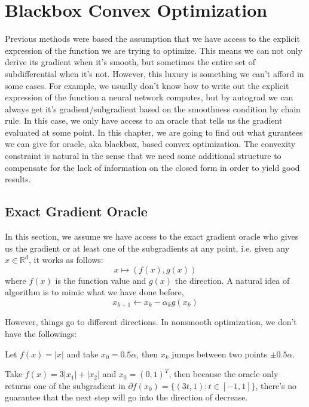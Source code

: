 \chapter{Blackbox Convex Optimization}

Previous methods were based the assumption that we have access to the explicit expression of the function we are trying to optimize. This means we can not only derive its gradient when it's smooth, but sometimes the entire set of subdifferential when it's not. However, this luxury is something we can't afford in some cases. For example, we usually don't know how to write out the explicit expression of the function a neural network computes, but by autograd we can always get it's gradient/subgradient based on the smoothness condition by chain rule. In this case, we only have access to an oracle that tells us the gradient evaluated at some point. In this chapter, we are going to find out what gurantees we can give for oracle, aka blackbox, based convex optimization. The convexity constraint is natural in the sense that we need some additional structure to compensate for the lack of information on the closed form in order to yield good results. 

\section{Exact Gradient Oracle}
In this section, we assume we have access to the exact gradient oracle who gives us the gradient or at least one of the subgradients at any point, i.e. given any $x \in \mathbb{R}^d$, it works as follows:
\begin{equation*}
    x \mapsto (f(x), g(x))
\end{equation*}
where $f(x)$ is the function value and $g(x)$ the direction. A natural idea of algorithm is to mimic what we have done before, 
\begin{equation*}
    x_{k+1} \leftarrow x_k - \alpha_k g(x_k)
\end{equation*}

However, things go to different directions. In nonsmooth optimization, we don't have the followings:
\begin{example}
    Let $f(x) = |x|$ and take $x_0 = 0.5\alpha$, then $x_k$ jumps between two points $\pm 0.5\alpha$.
\end{example}
\begin{example}
    Take $f(x) = 3|x_1| + |x_2|$ and $x_0 = (0, 1)^T$, then because the oracle only returns one of the subgradient in $\partial f(x_0) = \{(3t, 1) : t \in [-1, 1]\}$, there's no guarantee that the next step will go into the direction of decrease.     
\end{example}


